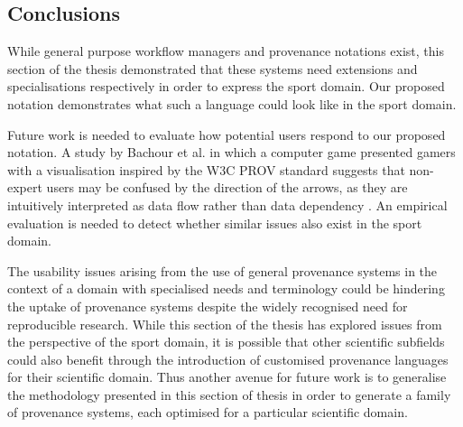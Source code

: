 \subsection{Conclusions}
\label{sec:provconclusion}

While general purpose workflow managers and provenance notations exist,
this section of the thesis demonstrated that these systems need extensions and
specialisations respectively in order to express the sport domain. Our
proposed notation demonstrates what such a language could look like in
the sport domain. %

Future work is needed to evaluate how potential users respond to our
proposed notation. A study by Bachour et al. in which a computer game
presented gamers with a visualisation inspired by the W3C PROV standard
suggests that non-expert users may be confused by the direction of the
arrows, as they are intuitively interpreted as data flow rather than
data dependency \cite{Bachour2015}. An empirical evaluation is needed to
detect whether similar issues also exist in the sport domain.

The usability issues arising from the use of general
provenance systems in the context of a domain with specialised needs and
terminology could be hindering the uptake of provenance systems despite
the widely recognised need for reproducible research. While this section of the thesis has
explored issues from the perspective of the sport domain, it is possible
that other scientific subfields could also benefit through the
introduction of customised provenance languages for their scientific
domain. Thus another avenue for future work is to generalise the methodology presented in this section of thesis in order to generate a family of provenance systems, each optimised for a particular scientific domain.
